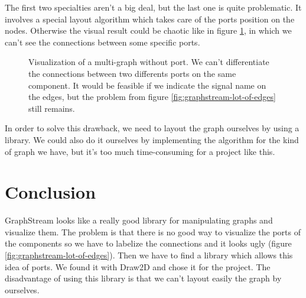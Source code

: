 The first two specialties aren't a big deal, but the last one is quite
problematic. It involves a special layout algorithm which takes care of the ports
position on the nodes. Otherwise the visual result could be chaotic like in
figure \ref{fig:multigraph-no-port}, in which we can't see the connections
between some specific ports.

\begin{figure}[H]
  \centering
  \caption[Visualization of a multi-graph without port]{Visualization of a
    multi-graph without port. We can't differentiate the connections between two
  differents ports on the same component. It would be feasible if we indicate
  the signal name on the edges, but the problem from figure
  \ref{fig:graphstream-lot-of-edges} still remains.}
  \label{fig:multigraph-no-port}
\end{figure}

In order to solve this drawback, we need to layout the graph ourselves by using a
library. We could also do it ourselves by implementing the algorithm for the kind
of graph we have, but it's too much time-consuming for a project like this.

\section{Conclusion}
\label{sec:viewing-library-conclusion}

GraphStream looks like a really good library for manipulating graphs and visualize
them. The problem is that there is no good way to visualize the ports of the
components so we have to labelize the connections and it looks ugly (figure
\ref{fig:graphstream-lot-of-edges}). Then we have to find a library which allows
this idea of ports. We found it with Draw2D and chose it for the project. The
disadvantage of using this library is that we can't layout easily the graph by
ourselves.


